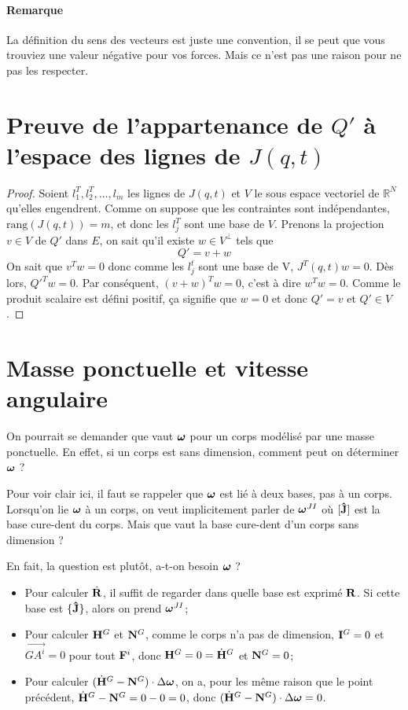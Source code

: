 \paragraph{Remarque}
La définition du sens des vecteurs est juste une convention, il se peut que vous trouviez une valeur négative pour vos forces.
Mais ce n'est pas une raison pour ne pas les respecter.

\annexe
\section{Preuve de l'appartenance de $Q'$ à l'espace des lignes de $J(q, t)$}
\label{ann:orthogonal}
\begin{proof}
Soient $l_1^T, l_2^T, \ldots, l_m$ les lignes de $J(q, t)$ et $V$ le sous espace vectoriel de $\mathbb{R}^N$ qu'elles engendrent.
Comme on suppose que les contraintes sont indépendantes, $\mathrm{rang}(J(q, t)) = m$, et donc les $l_j^T$ sont une base de $V$.
Prenons la projection $v \in V$ de $Q'$ dans $E$, on sait qu'il existe $w \in V^\perp$ tels que
\[ Q' = v + w \]
On sait que $v^Tw = 0$ donc comme les $l_j^t$ sont une base de V, $J^T(q, t)w = 0$.
Dès lors, $Q'^T w = 0$.
Par conséquent, $(v + w)^T w = 0$, c'est à dire $w^T w = 0$.
Comme le produit scalaire est défini positif, ça signifie que $w = 0$ et donc $Q' = v$ et $Q' \in V$.
\end{proof}

\section{Masse ponctuelle et vitesse angulaire}
On pourrait se demander que vaut ${\bm \omega}$ pour un corps modélisé par une masse ponctuelle.
En effet, si un corps est sans dimension, comment peut on déterminer ${\bm \omega}$ ?

Pour voir clair ici, il faut se rappeler que ${\bm \omega}$ est lié à deux bases, pas à un corps.
Lorsqu'on lie ${\bm \omega}$ à un corps, on veut implicitement parler de ${\bm \omega}^{JI}$ où $[{\bf\hat{J}}]$ est la base cure-dent du corps.
Mais que vaut la base cure-dent d'un corps sans dimension ?

En fait, la question est plutôt, a-t-on besoin ${\bm \omega}$ ?
\begin{itemize}
	\item Pour calculer $\dot{\bf R}$,
		il suffit de regarder dans quelle base est exprimé ${\bf R}$.
		Si cette base est $\{{\bf\hat{J}}\}$, alors on prend ${\bm \omega}^{JI}$;
	\item Pour calculer ${\bf H}^G$ et ${\bf N}^G$, comme le corps n'a pas de dimension, ${\bf I}^G = 0$ et $\vec{GA^i} = 0$ pour tout ${\bf F}^i$, donc
		${\bf H}^G = 0 = \dot{{\bf H}}^G$ et ${\bf N}^G = 0$;
	\item Pour calculer $(\dot{{\bf H}}^G - {\bf N}^G) \cdot \Delta {\bm \omega}$, on a, pour les même raison que le point précédent,
		$\dot{{\bf H}}^G - {\bf N}^G = 0 - 0 = 0$, donc $(\dot{{\bf H}}^G - {\bf N}^G) \cdot \Delta {\bm \omega} = 0$.
\end{itemize}


